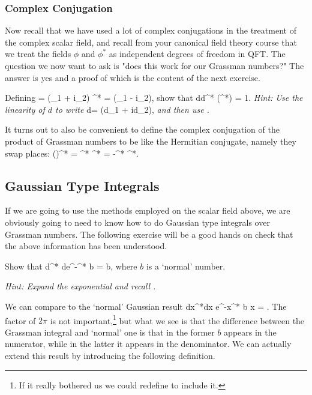 \subsubsection{Complex Conjugation}

Now recall that we have used a lot of complex conjugations in the treatment of the complex scalar field, and recall from your canonical field theory course that we treat the fields $\phi$ and $\phi^*$ as independent degrees of freedom in QFT. The question we now want to ask is "does this work for our Grassman numbers?" The answer is yes and a proof of which is the content of the next exercise. 

\bbox 
    Defining 
    \bse 
        \theta = \big(\theta_1 + i\theta_2) \qand \theta^* = \big(\theta_1 - i\theta_2),
    \ese 
    show that 
    \bse 
        \int d\theta d\theta^* (\theta^*\theta) = 1.
    \ese
    \textit{Hint: Use the linearity of $d$ to write}
    \bse 
        d\theta = \big(d\theta_1 + id\theta_2),
    \ese 
    \textit{and then use .}
\ebox 

It turns out to also be convenient to define the complex conjugation of the product of Grassman numbers to be like the Hermitian conjugate, namely they swap places:
\be 
\label{eqn:ComplexConjTwoGrassman}
    (\theta\eta)^* = \eta^* \theta^* = -\theta^* \eta^*.
\ee 

\subsection{Gaussian Type Integrals}

If we are going to use the methods employed on the scalar field above, we are obviously going to need to know how to do Gaussian type integrals over Grassman numbers. The following exercise will be a good hands on check that the above information has been understood.

\bbox 
    Show that 
    \be
    \label{eqn:GrassmanIntegralExp}
        \int d\theta^* d\theta e^{-\theta^* b \theta} = b,
    \ee
    where $b$ is a `normal' number. 
    
    \textit{Hint: Expand the exponential and recall  .}
\ebox  

We can compare  to the `normal' Gaussian result 
\bse 
    \int dx^*dx e^{-x^* b x} = .
\ese
The factor of $2\pi$ is not important,\footnote{If it really bothered us we could redefine  to include it.} but what we see is that the difference between the Grassman integral and `normal' one is that in the former $b$ appears in the numerator, while in the latter it appears in the denominator. We can actually extend this result by introducing the following definition. 

